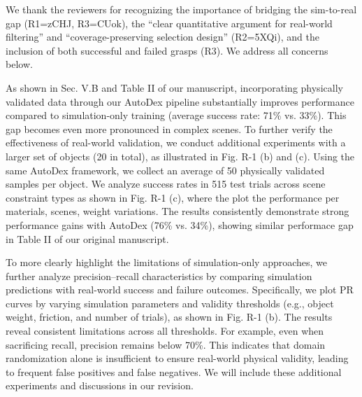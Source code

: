 \documentclass[conference]{IEEEtran}
\newcommand{\rssparagraph}[1]{{\bf #1.}}
\begin{document}

We thank the reviewers for recognizing the importance of bridging the sim-to-real gap ({\color{R1}R1=zCHJ}, {\color{R3}R3=CUok}), the ``clear quantitative argument for real-world filtering'' and ``coverage-preserving selection design'' ({\color{R2}R2=5XQi}), and the inclusion of both successful and failed grasps ({\color{R3}R3}). We address all concerns below.



\noindent [\textcolor{cyan}{All}] \rssparagraph{Necessity of real-world validation}
As shown in Sec. V.B and Table II of our manuscript, incorporating physically validated data through our AutoDex pipeline substantially improves performance compared to simulation-only training (average success rate: 71\% vs. 33\%). This gap becomes even more pronounced in complex scenes.
%
To further verify the effectiveness of real-world validation, we conduct additional experiments with a larger set of objects (20 in total), as illustrated in Fig. R-1 (b) and (c). Using the same AutoDex framework, we collect an average of 50 physically validated samples per object. We analyze success rates in 515 test trials across scene constraint types as shown in Fig. R-1 (c), where the plot the performance per materials, scenes, weight variations. The results consistently demonstrate strong performance gains with AutoDex (76\% vs. 34\%), showing similar performace gap in Table II of our original manuscript.

To more clearly highlight the limitations of simulation-only approaches, we further analyze precision--recall characteristics by comparing simulation predictions with real-world success and failure outcomes. Specifically, we plot PR curves by varying simulation parameters and validity thresholds (e.g., object weight, friction, and number of trials), as shown in Fig. R-1 (b). The results reveal consistent limitations across all thresholds. For example, even when sacrificing recall, precision remains below 70\%. This indicates that domain randomization alone is insufficient to ensure real-world physical validity, leading to frequent false positives and false negatives. We will include these additional experiments and discussions in our revision.
\end{document}
